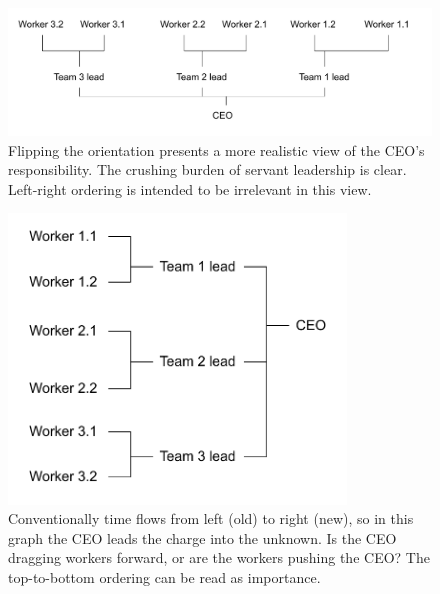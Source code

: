 \begin{figure}
\includegraphics[width=1\textwidth]{images/org-chart-orientation-ceo-at-bottom.pdf}
\caption{Flipping the orientation presents a more realistic view of the CEO's responsibility. The crushing burden of servant leadership is clear. Left-right ordering is intended to be irrelevant in this view.}
\label{org_chart_orientation_ceo-at-bottom}
\end{figure}

\begin{figure}
\includegraphics[width=0.8\textwidth]{images/org-chart-orientation-ceo-leads.pdf}
\caption{Conventionally time flows from left (old) to right (new), so in this graph the CEO leads the charge into the unknown. Is the CEO dragging workers forward, or are the workers pushing the CEO? The top-to-bottom ordering can be read as importance. }
\label{org_chart_orientation_ceo-leads}
\end{figure}

